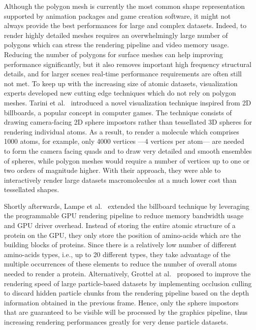 Although the polygon mesh is currently the most common shape representation supported by animation packages and game creation software, it might not always provide the best performances for large and complex datasets.
Indeed, to render highly detailed meshes requires an overwhelmingly large number of polygons which can stress the rendering pipeline and video memory usage.
Reducing the number of polygons for surface meshes can help improving performance significantly, but it also removes important high frequency structural details, and for larger scenes real-time performance requirements are often still not met.
To keep up with the increasing size of atomic datasets, visualization experts developed new cutting edge techniques which do not rely on polygon meshes.
Tarini et al.~\cite{tarini2006ambient} introduced a novel visualization technique inspired from 2D billboards, a popular concept in computer games.
The technique consists of drawing camera-facing 2D sphere impostors rather than tessellated 3D spheres for rendering individual atoms.
As a result, to render a molecule which comprises 1000 atoms, for example, only 4000 vertices ---4 vertices per atom--- are needed to form the camera facing quads and to draw very detailed and smooth ensembles of spheres, while polygon meshes would require a number of vertices up to one or two orders of magnitude higher.
With their approach, they were able to interactively render large datasets macromolecules at a much lower cost than tessellated shapes.

Shortly afterwards, Lampe et al.~\cite{lampe2007two} extended the billboard technique by leveraging the programmable GPU rendering pipeline to reduce memory bandwidth usage and GPU driver overhead. 
Instead of storing the entire atomic structure of a protein on the GPU, they only store the position of amino-acids which are the building blocks of proteins.
Since there is a relatively low number of different amino-acids types, i.e., up to 20 different types, they take advantage of the multiple occurrences of these elements to reduce the number of overall atoms needed to render a protein.
Alternatively, Grottel at al.~\cite{grottel2010coherent} proposed to improve the rendering speed of large particle-based datasets by implementing occlusion culling to discard hidden particle chunks from the rendering pipeline based on the depth information obtained in the previous frame.
Hence, only the sphere impostors that are guaranteed to be visible will be processed by the graphics pipeline, thus increasing rendering performances greatly for very dense particle datasets.

